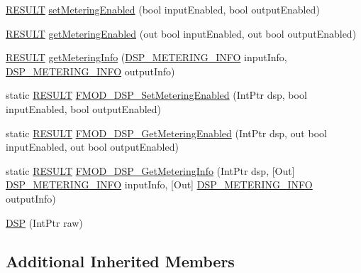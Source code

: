 \begin{DoxyCompactItemize}
\item 
\hyperlink{namespace_f_m_o_d_a305d1176ef3f8c8815861a60407ac33d}{R\+E\+S\+U\+LT} \hyperlink{class_f_m_o_d_1_1_d_s_p_ab6bb9f4fa104f2ec9ad8c865901cb58f}{set\+Metering\+Enabled} (bool input\+Enabled, bool output\+Enabled)
\item 
\hyperlink{namespace_f_m_o_d_a305d1176ef3f8c8815861a60407ac33d}{R\+E\+S\+U\+LT} \hyperlink{class_f_m_o_d_1_1_d_s_p_a1e6600f84abe122d30f3f708b41dd24e}{get\+Metering\+Enabled} (out bool input\+Enabled, out bool output\+Enabled)
\item 
\hyperlink{namespace_f_m_o_d_a305d1176ef3f8c8815861a60407ac33d}{R\+E\+S\+U\+LT} \hyperlink{class_f_m_o_d_1_1_d_s_p_a1af8bff7095c5f0abd05ac96a4c71c29}{get\+Metering\+Info} (\hyperlink{class_f_m_o_d_1_1_d_s_p___m_e_t_e_r_i_n_g___i_n_f_o}{D\+S\+P\+\_\+\+M\+E\+T\+E\+R\+I\+N\+G\+\_\+\+I\+N\+FO} input\+Info, \hyperlink{class_f_m_o_d_1_1_d_s_p___m_e_t_e_r_i_n_g___i_n_f_o}{D\+S\+P\+\_\+\+M\+E\+T\+E\+R\+I\+N\+G\+\_\+\+I\+N\+FO} output\+Info)
\item 
static \hyperlink{namespace_f_m_o_d_a305d1176ef3f8c8815861a60407ac33d}{R\+E\+S\+U\+LT} \hyperlink{class_f_m_o_d_1_1_d_s_p_a979e52e290de9943a19736d57d507876}{F\+M\+O\+D\+\_\+\+D\+S\+P\+\_\+\+Set\+Metering\+Enabled} (Int\+Ptr dsp, bool input\+Enabled, bool output\+Enabled)
\item 
static \hyperlink{namespace_f_m_o_d_a305d1176ef3f8c8815861a60407ac33d}{R\+E\+S\+U\+LT} \hyperlink{class_f_m_o_d_1_1_d_s_p_adb966969e48acdde47d35567d4100545}{F\+M\+O\+D\+\_\+\+D\+S\+P\+\_\+\+Get\+Metering\+Enabled} (Int\+Ptr dsp, out bool input\+Enabled, out bool output\+Enabled)
\item 
static \hyperlink{namespace_f_m_o_d_a305d1176ef3f8c8815861a60407ac33d}{R\+E\+S\+U\+LT} \hyperlink{class_f_m_o_d_1_1_d_s_p_a6687d77ca9c23fa9d8f5f1ca8495b2e3}{F\+M\+O\+D\+\_\+\+D\+S\+P\+\_\+\+Get\+Metering\+Info} (Int\+Ptr dsp, \mbox{[}Out\mbox{]} \hyperlink{class_f_m_o_d_1_1_d_s_p___m_e_t_e_r_i_n_g___i_n_f_o}{D\+S\+P\+\_\+\+M\+E\+T\+E\+R\+I\+N\+G\+\_\+\+I\+N\+FO} input\+Info, \mbox{[}Out\mbox{]} \hyperlink{class_f_m_o_d_1_1_d_s_p___m_e_t_e_r_i_n_g___i_n_f_o}{D\+S\+P\+\_\+\+M\+E\+T\+E\+R\+I\+N\+G\+\_\+\+I\+N\+FO} output\+Info)
\item 
\hyperlink{class_f_m_o_d_1_1_d_s_p_a11c85814080acca2c56be2f4bae6acb1}{D\+SP} (Int\+Ptr raw)
\end{DoxyCompactItemize}
\subsection*{Additional Inherited Members}


